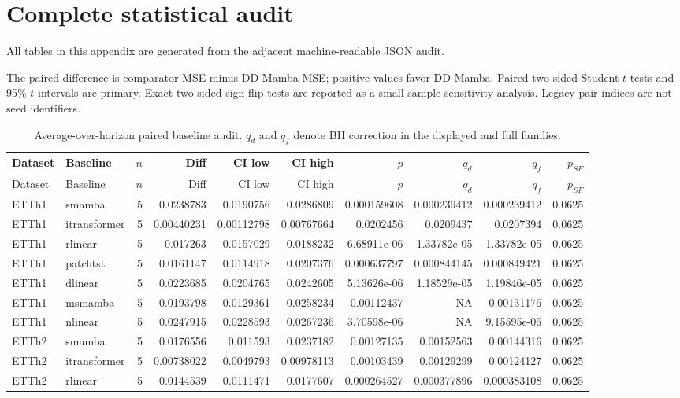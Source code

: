 \section{Complete statistical audit}
\label{app:complete-statistical-audit}
All tables in this appendix are generated from the adjacent machine-readable JSON audit.

The paired difference is comparator MSE minus DD-Mamba MSE; positive values favor DD-Mamba. Paired two-sided Student $t$ tests and 95\% $t$ intervals are primary. Exact two-sided sign-flip tests are reported as a small-sample sensitivity analysis. Legacy pair indices are not seed identifiers.

\begin{longtable}{llrrrrrrrr}
\caption{Average-over-horizon paired baseline audit. $q_d$ and $q_f$ denote BH correction in the displayed and full families.}\\
\toprule
Dataset & Baseline & $n$ & Diff & CI low & CI high & $p$ & $q_d$ & $q_f$ & $p_{SF}$ \\
\midrule
\endfirsthead
\toprule
Dataset & Baseline & $n$ & Diff & CI low & CI high & $p$ & $q_d$ & $q_f$ & $p_{SF}$ \\
\midrule
\endhead
ETTh1 & smamba & 5 & 0.0238783 & 0.0190756 & 0.0286809 & 0.000159608 & 0.000239412 & 0.000239412 & 0.0625 \\
ETTh1 & itransformer & 5 & 0.00440231 & 0.00112798 & 0.00767664 & 0.0202456 & 0.0209437 & 0.0207394 & 0.0625 \\
ETTh1 & rlinear & 5 & 0.017263 & 0.0157029 & 0.0188232 & 6.68911e-06 & 1.33782e-05 & 1.33782e-05 & 0.0625 \\
ETTh1 & patchtst & 5 & 0.0161147 & 0.0114918 & 0.0207376 & 0.000637797 & 0.000844145 & 0.000849421 & 0.0625 \\
ETTh1 & dlinear & 5 & 0.0223685 & 0.0204765 & 0.0242605 & 5.13626e-06 & 1.18529e-05 & 1.19846e-05 & 0.0625 \\
ETTh1 & msmamba & 5 & 0.0193798 & 0.0129361 & 0.0258234 & 0.00112437 & NA & 0.00131176 & 0.0625 \\
ETTh1 & nlinear & 5 & 0.0247915 & 0.0228593 & 0.0267236 & 3.70598e-06 & NA & 9.15595e-06 & 0.0625 \\
ETTh2 & smamba & 5 & 0.0176556 & 0.011593 & 0.0237182 & 0.00127135 & 0.00152563 & 0.00144316 & 0.0625 \\
ETTh2 & itransformer & 5 & 0.00738022 & 0.0049793 & 0.00978113 & 0.00103439 & 0.00129299 & 0.00124127 & 0.0625 \\
ETTh2 & rlinear & 5 & 0.0144539 & 0.0111471 & 0.0177607 & 0.000264527 & 0.000377896 & 0.000383108 & 0.0625 \\

\end{longtable}
